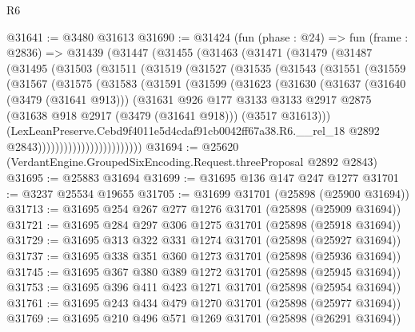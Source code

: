 \begin{lexlean}{R6}
\begin{coremodule}
@31641 := @3480 @31613
@31690 := @31424
    (fun (phase : @24) =>
    fun (frame : @2836) =>
    @31439
      (@31447
        (@31455
          (@31463
            (@31471
              (@31479
                (@31487
                  (@31495
                    (@31503
                      (@31511
                        (@31519
                          (@31527
                            (@31535
                              (@31543
                                (@31551
                                  (@31559
                                    (@31567
                                      (@31575
                                        (@31583
                                          (@31591
                                            (@31599
                                              (@31623
                                                (@31630
                                                  (@31637
                                                    (@31640 (@3479 (@31641 @913)))
                                                    (@31631
                                                      @926
                                                      @177
                                                      @3133
                                                      @3133
                                                      @2917
                                                      @2875
                                                      (@31638 @918 @2917 (@3479 (@31641 @918)))
                                                      (@3517 @31613)))
                                                  (LexLeanPreserve.Cebd9f4011e5d4cdaf91cb0042ff67a38.R6.__rel_18
                                                    @2892
                                                    @2843))))))))))))))))))))))))
@31694 := @25620 (VerdantEngine.GroupedSixEncoding.Request.threeProposal @2892 @2843)
@31695 := @25883 @31694
@31699 := @31695 @136 @147 @247 @1277
@31701 := @3237 @25534 @19655
@31705 := @31699 @31701 (@25898 (@25900 @31694))
@31713 := @31695 @254 @267 @277 @1276 @31701 (@25898 (@25909 @31694))
@31721 := @31695 @284 @297 @306 @1275 @31701 (@25898 (@25918 @31694))
@31729 := @31695 @313 @322 @331 @1274 @31701 (@25898 (@25927 @31694))
@31737 := @31695 @338 @351 @360 @1273 @31701 (@25898 (@25936 @31694))
@31745 := @31695 @367 @380 @389 @1272 @31701 (@25898 (@25945 @31694))
@31753 := @31695 @396 @411 @423 @1271 @31701 (@25898 (@25954 @31694))
@31761 := @31695 @243 @434 @479 @1270 @31701 (@25898 (@25977 @31694))
@31769 := @31695 @210 @496 @571 @1269 @31701 (@25898 (@26291 @31694))

\end{coremodule}
\end{lexlean}
